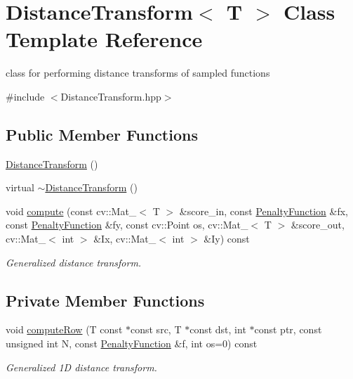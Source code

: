 \hypertarget{classDistanceTransform}{\section{Distance\-Transform$<$ T $>$ Class Template Reference}
\label{classDistanceTransform}
}


class for performing distance transforms of sampled functions  




{\ttfamily \#include $<$Distance\-Transform.\-hpp$>$}

\subsection*{Public Member Functions}
\begin{DoxyCompactItemize}
\item 
\hyperlink{classDistanceTransform_ae6c06d78413d63dff5abdc8abd44499d}{Distance\-Transform} ()
\item 
virtual \hyperlink{classDistanceTransform_ada481afc2685e2e52b9c51ed4950ad60}{$\sim$\-Distance\-Transform} ()
\item 
void \hyperlink{classDistanceTransform_a973ae7b0b971b4c5d5a07e56ec6ea31d}{compute} (const cv\-::\-Mat\-\_\-$<$ T $>$ \&score\-\_\-in, const \hyperlink{classPenaltyFunction}{Penalty\-Function} \&fx, const \hyperlink{classPenaltyFunction}{Penalty\-Function} \&fy, const cv\-::\-Point os, cv\-::\-Mat\-\_\-$<$ T $>$ \&score\-\_\-out, cv\-::\-Mat\-\_\-$<$ int $>$ \&Ix, cv\-::\-Mat\-\_\-$<$ int $>$ \&Iy) const 
\begin{DoxyCompactList}\small\item\em Generalized distance transform. \end{DoxyCompactList}\end{DoxyCompactItemize}
\subsection*{Private Member Functions}
\begin{DoxyCompactItemize}
\item 
void \hyperlink{classDistanceTransform_a67cc53dc7aa6b93e931d2317208248ba}{compute\-Row} (T const $\ast$const src, T $\ast$const dst, int $\ast$const ptr, const unsigned int N, const \hyperlink{classPenaltyFunction}{Penalty\-Function} \&f, int os=0) const 
\begin{DoxyCompactList}\small\item\em Generalized 1\-D distance transform. \end{DoxyCompactList}\end{DoxyCompactItemize}


